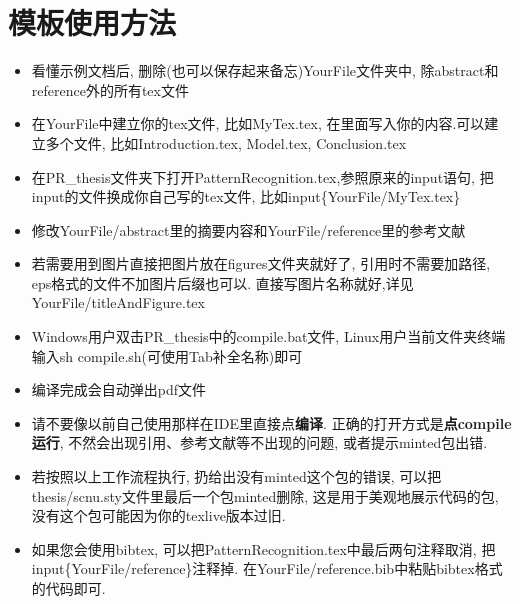 \section{模板使用方法}
\begin{itemize}
  \item 看懂示例文档后, 删除(也可以保存起来备忘)YourFile文件夹中, 除abstract和reference外的所有tex文件
  \item 在YourFile中建立你的tex文件, 比如MyTex.tex, 在里面写入你的内容.可以建立多个文件, 比如Introduction.tex, Model.tex, Conclusion.tex
\item 在PR\_thesis文件夹下打开PatternRecognition.tex,参照原来的input语句, 把input的文件换成你自己写的tex文件, 比如input\{YourFile/MyTex.tex\}
  \item 修改YourFile/abstract里的摘要内容和YourFile/reference里的参考文献
  \item 若需要用到图片直接把图片放在figures文件夹就好了, 引用时不需要加路径, eps格式的文件不加图片后缀也可以. 直接写图片名称就好,详见YourFile/titleAndFigure.tex
  \item Windows用户双击PR\_thesis中的compile.bat文件, Linux用户当前文件夹终端输入sh compile.sh(可使用Tab补全名称)即可
  \item 编译完成会自动弹出pdf文件\cite{handy2003planning}
  \item 请不要像以前自己使用那样在IDE里直接点\textbf{编译}. 正确的打开方式是\textbf{点compile运行}, 不然会出现引用、参考文献等不出现的问题, 或者提示minted包出错.
  \item 若按照以上工作流程执行, 扔给出没有minted这个包的错误, 可以把thesis/scnu.sty文件里最后一个包minted删除, 这是用于美观地展示代码的包, 没有这个包可能因为你的texlive版本过旧.
  \item 如果您会使用bibtex, 可以把PatternRecognition.tex中最后两句注释取消, 把input\{YourFile/reference\}注释掉. 在YourFile/reference.bib中粘贴bibtex格式的代码即可.
\end{itemize}
